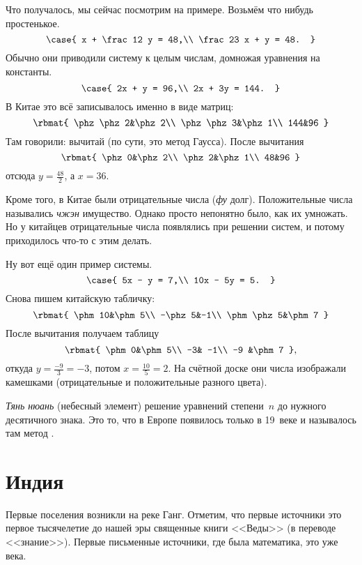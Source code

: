 \documentclass[a4paper,oneside,fleqn,10pt]{article}
\begin{document}
Что получалось, мы сейчас посмотрим на примере. Возьмём что нибудь простенькое.
$$
  \case{
    x + \frac12 y = 48,\\
    \frac23 x + y = 48.
  }
$$
Обычно они приводили систему к целым числам, домножая уравнения на константы.
$$
  \case{
    2x + y = 96,\\
    2x + 3y = 144.
  }
$$
В Китае это всё записывалось именно в виде матриц:
$$
  \rbmat{
    \phz\phz2&\phz2\\
    \phz\phz3&\phz1\\
    144&96
  }
$$
Там говорили: вычитай (по сути, это метод Гаусса). После вычитания
$$
  \rbmat{
    \phz0&\phz2\\
    \phz2&\phz1\\
    48&96
  }
$$
отсюда $y = \frac{48}{2}$, а $x = 36$.

Кроме того, в Китае были отрицательные числа (\emph{фу} долг).
Положительные числа назывались \emph{чжэн} имущество.
Однако просто непонятно было, как их умножать.
Но у китайцев отрицательные числа появлялись при решении систем,
и потому приходилось что-то с этим делать.

Ну вот ещё один пример системы.
$$
  \case{
    5x - y = 7,\\
    10x - 5y = 5.
  }
$$
Снова пишем китайскую табличку:
$$
  \rbmat{
    \phm10&\phm5\\
    -\phz5&-1\\
    \phm\phz5&\phm7
  }
$$
После вычитания получаем таблицу
$$
  \rbmat{
    \phm0&\phm5\\
    -3& -1\\
    -9 &\phm7
  },
$$
откуда $y = \frac{-9}{3} = -3$, потом $x = \frac{10}{5} =2$.
На счётной доске они числа изображали камешками (отрицательные и положительные
разного цвета).

\emph{Тянь нюань} (небесный элемент) решение уравнений степени~$n$
до нужного десятичного знака. Это то, что в Европе появилось только в 19~веке
и называлось там метод  .


\section{Индия}

Первые поселения возникли на реке Ганг. Отметим, что первые источники это первое тысячелетие до нашей
эры священные книги <<Веды>> (в переводе <<знание>>). Первые письменные
источники, где была математика, это уже  века.
\end{document}
